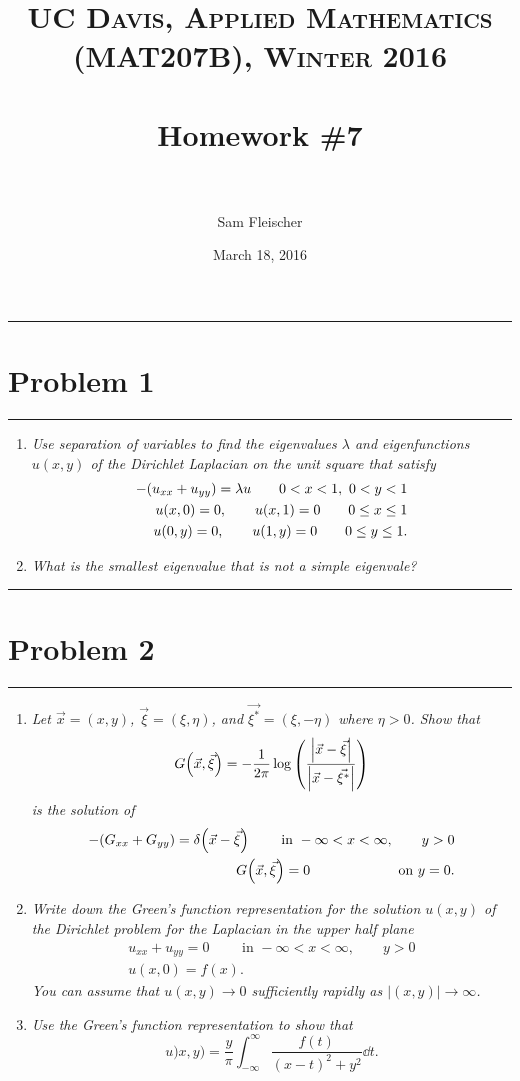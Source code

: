 \documentclass{article} %
\title{ 
\normalfont \normalsize 
\textsc{UC Davis, Applied Mathematics (MAT207B), Winter 2016} \\ [25pt] %
\horrule{2pt} \\[0.4cm] %
\Huge Homework \#7 \\ %
\horrule{2pt} \\[0.5cm] %
}
\author{\huge Sam Fleischer} %
\date{March 18, 2016} %
\theoremstyle{plain}
\newcommand{\problem}[1]{
\vspace{.375cm}
\begin{minipage}{\textwidth}
    \begin{center}
        \noindent\rule{5cm}{1pt}
    \end{center}
    \section{\bf #1}
    \begin{center}
        \noindent\rule{5cm}{1pt}
    \end{center}
    \vspace{0.25cm}
\end{minipage}
}
\begin{document}
\thispagestyle{empty}

\maketitle %

\makeatletter
{}
\makeatother

\pagebreak

\problem{Problem 1}
\begin{enumerate}[\it (a)]
    \item
        \emph{Use separation of variables to find the eigenvalues $\lambda$ and eigenfunctions $u(x,y)$ of the Dirichlet Laplacian on the unit square that satisfy}
        \begin{align*}
            -\qty(u_{xx} + u_{yy}) = \lambda u \qquad 0 < x < 1,\ 0 < y < 1 \\
            u(x,0) = 0,\qquad u(x,1) = 0 \qquad 0 \leq x \leq 1 \\
            u(0,y) = 0,\qquad u(1,y) = 0 \qquad 0 \leq y \leq 1.
        \end{align*}
    \item
        \emph{What is the smallest eigenvalue that is not a simple eigenvale?}
\end{enumerate}









\problem{Problem 2}
\begin{enumerate}[\it (a)]
    \item
        \emph{Let $\vec{x} = (x,y)$, $\vec{\xi} = (\xi, \eta)$, and $\vec{\xi^*} = (\xi, -\eta)$ where $\eta > 0$.  Show that $$G\qty(\vec{x}, \vec{\xi}) = - \frac{1}{2\pi}\log\qty(\frac{\left|\vec{x} - \vec{\xi}\right|}{\left|\vec{x} - \vec{\xi^*}\right|})$$ is the solution of}
        \begin{align*}
            -\qty(G_{xx} + G_{yy}) = \delta\qty(\vec{x} - \vec{\xi}) \qquad \text{ in } - \infty < x < \infty, \qquad y > 0 \\
            G\qty(\vec{x}, \vec{\xi}) = 0 \qquad\qquad\qquad \text{ on } y = 0.
        \end{align*}
    \item
        \emph{Write down the Green's function representation for the solution $u(x,y)$ of the Dirichlet problem for the Laplacian in the upper half plane}
        \begin{align*}
            u_{xx} + u_{yy} = 0 \qquad \text{ in } -\infty < x < \infty, \qquad y > 0 \\
            u(x,0) = f(x).
        \end{align*}
        \emph{You can assume that $u(x,y) \rightarrow 0$ sufficiently rapidly as $|(x,y)| \rightarrow \infty$.}
    \item
        \emph{Use the Green's function representation to show that $$u)x,y) = \frac{y}{\pi}\int_{-\infty}^\infty \frac{f(t)}{(x-t)^2 + y^2}\dd t.$$}
\end{enumerate}
\end{document}

